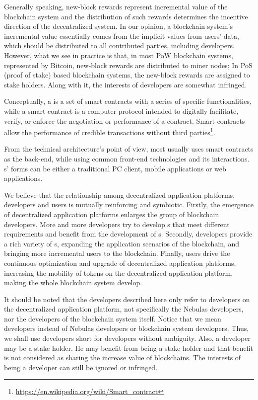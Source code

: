 Generally speaking,  new-block rewards represent incremental value of the
blockchain system and the distribution of such rewards determines the incentive
direction of the decentralized system. In our opinion, a blockchain system's
incremental value essentially comes from the implicit values from users' data,
which should be distributed to all contributed parties, including \dapp
developers. However, what we see in practice is that, in most PoW blockchain
systems, represented by Bitcoin, new-block rewards are distributed to miner
nodes; In PoS (proof of stake) based blockchain systems, the new-block rewards are assigned to  stake holders. Along with it, the interests of \dapp developers are somewhat infringed.


Conceptually, a \dapp is a set of smart contracts with a series of specific
functionalities, while a smart contract is a computer protocol intended to
digitally facilitate, verify, or enforce the negotiation or performance of a
contract. Smart contracts allow the performance of credible transactions
without third
parties\footnote{\url{https://en.wikipedia.org/wiki/Smart\_contract}}.

From the technical architecture's point of view, most \dapp usually uses smart contracts as the back-end, while using common front-end technologies and its interactions. {\dapp}s' forms can be either a traditional PC client, mobile applications or web applications.

We believe that the relationship among decentralized application platforms, \dapp developers and \dapp users is mutually reinforcing and symbiotic. Firstly, the emergence of decentralized application platforms enlarges the group of blockchain developers. More and more developers try to develop {\dapp}s that meet different requirements and benefit from the development of {\dapp}s. Secondly, \dapp developers provide a rich variety of {\dapp}s, expanding the application scenarios of the blockchain, and bringing more incremental users to the blockchain. Finally, \dapp users drive the continuous optimization and upgrade of decentralized application platforms, increasing the mobility of tokens on the decentralized application platform, making the whole blockchain system develop.

It should be noted that the developers described here only refer to developers on the decentralized application platform, not specifically the Nebulas developers, nor the developers of the blockchain system itself.
Notice that we mean \dapp developers instead of Nebulas \dapp developers or
blockchain system developers. Thus, we shall use developers short for \dapp
developers without ambiguity. Also, a \dapp developer may be a stake holder.
He may benefit from being a stake holder and that benefit is not considered
as sharing the increase value of blockchains. The interests of being a developer can still be ignored or infringed.



